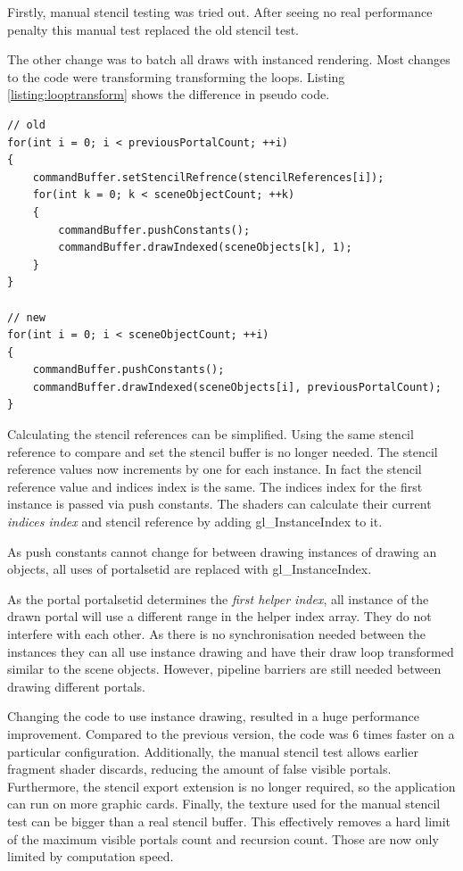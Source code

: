 Firstly, manual stencil testing was tried out. After seeing no real performance penalty this manual test replaced the old stencil test.

The other change was to batch all draws with instanced rendering. Most changes to the code were transforming transforming the loops. Listing \ref{listing:looptransform} shows the difference in pseudo code.

\begin{lstlisting}[caption={Pseudocode Loop Transformation}, label=listing:looptransform]
// old 
for(int i = 0; i < previousPortalCount; ++i)
{
	commandBuffer.setStencilRefrence(stencilReferences[i]);
	for(int k = 0; k < sceneObjectCount; ++k)
	{
		commandBuffer.pushConstants();
		commandBuffer.drawIndexed(sceneObjects[k], 1);
	}
}

// new
for(int i = 0; i < sceneObjectCount; ++i)
{
	commandBuffer.pushConstants();
	commandBuffer.drawIndexed(sceneObjects[i], previousPortalCount);
}
\end{lstlisting}


Calculating the stencil references can be simplified. Using the same stencil reference to compare and set the stencil buffer is no longer needed. The stencil reference values now increments by one for each instance. In fact the stencil reference value and indices index is the same. The indices index for the first instance is passed via push constants. The shaders can calculate their current \textit{indices index} and stencil reference by adding gl\_InstanceIndex to it.

As push constants cannot change for between drawing instances of drawing an objects, all uses of  \gls{portalsetid} are replaced with gl\_InstanceIndex.

As the portal \gls{portalsetid} determines the \textit{first helper index}, all instance of the drawn portal will use a different range in the helper index array. They do not interfere with each other. As there is no synchronisation needed between the instances they can all use instance drawing and have their draw loop transformed similar to the scene objects. However, pipeline barriers are still needed between drawing different portals.

Changing the code to use instance drawing, resulted in a huge performance improvement. Compared to the previous version, the code was 6 times faster on a particular configuration. Additionally, the manual stencil test allows earlier fragment shader discards, reducing the amount of false visible portals. Furthermore, the stencil export extension is no longer required, so the application can run on more graphic cards. Finally, the texture used for the manual stencil test can be bigger than a real stencil buffer. This effectively removes a hard limit of the maximum visible portals count and recursion count. Those are now only limited by computation speed.


